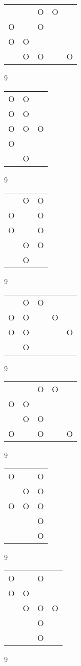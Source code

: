 \begin{tabular}{|m{0.2cm}m{0.2cm}m{0.2cm}m{0.2cm}m{0.2cm}|}\hline
 & &O&O& \\
O& &O& & \\
O&O& & & \\
 &O&O& &O\\
\hline\end{tabular}9
\begin{tabular}{|m{0.2cm}m{0.2cm}m{0.2cm}|}\hline
O&O& \\
O&O& \\
O&O&O\\
O& & \\
 &O& \\
\hline\end{tabular}9
\begin{tabular}{|m{0.2cm}m{0.2cm}m{0.2cm}|}\hline
 &O&O\\
O& &O\\
O& &O\\
 &O&O\\
 &O& \\
\hline\end{tabular}9
\begin{tabular}{|m{0.2cm}m{0.2cm}m{0.2cm}m{0.2cm}m{0.2cm}|}\hline
 &O&O& & \\
O&O& &O& \\
O&O& & &O\\
 &O& & & \\
\hline\end{tabular}9
\begin{tabular}{|m{0.2cm}m{0.2cm}m{0.2cm}m{0.2cm}m{0.2cm}|}\hline
 & &O&O& \\
O&O& & & \\
 &O&O& & \\
O& &O& &O\\
\hline\end{tabular}9
\begin{tabular}{|m{0.2cm}m{0.2cm}m{0.2cm}|}\hline
O& &O\\
 &O&O\\
O&O&O\\
 & &O\\
 & &O\\
\hline\end{tabular}9
\begin{tabular}{|m{0.2cm}m{0.2cm}m{0.2cm}m{0.2cm}|}\hline
O& &O& \\
O&O& & \\
 &O&O&O\\
 & &O& \\
 & &O& \\
\hline\end{tabular}9
